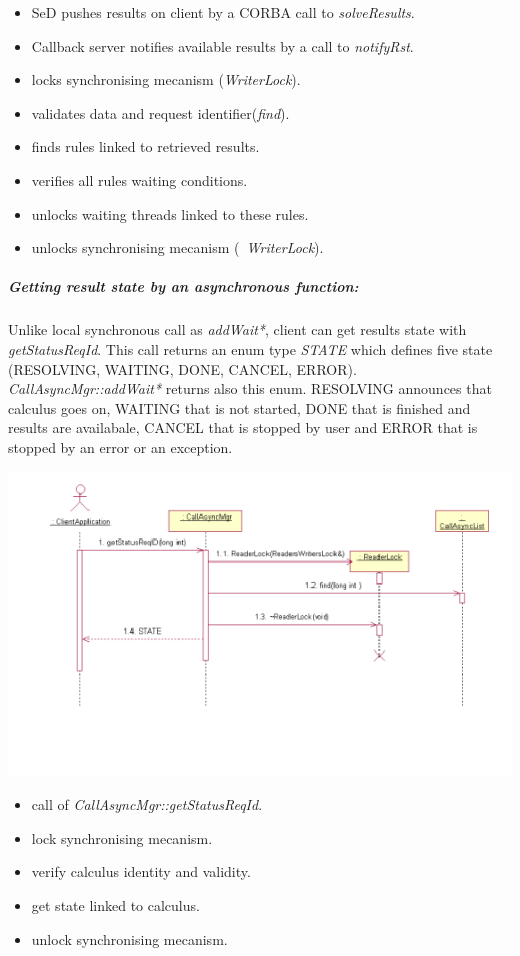   \begin{itemize}
  \item SeD pushes results on client by a CORBA call to \emph{solveResults}.
  \item Callback server notifies available results by a call to \emph{notifyRst}.
  \item locks synchronising mecanism (\emph{WriterLock}).
  \item validates data and request identifier(\emph{find}).
  \item finds rules linked to retrieved results.
  \item verifies all rules waiting conditions.
  \item unlocks waiting threads linked to these rules.
  \item unlocks synchronising mecanism (\emph{~WriterLock}).
  \end{itemize}

  \subparagraph{Getting result state by an asynchronous function:}
  Unlike local synchronous call as \emph{addWait*}, client can get results
  state with \emph{getStatusReqId}. This call returns an enum type \emph{STATE}
  which defines five state (RESOLVING, WAITING, DONE, CANCEL, ERROR).
  \emph{CallAsyncMgr::addWait*} returns also this enum.
  RESOLVING announces that calculus goes on, WAITING that is not started,
  DONE that is finished and results are availabale, CANCEL that is stopped
  by user and ERROR that is stopped by an error or an exception.

  \begin{center}
  \includegraphics{./fig/CallAsyncProbeSequenceDiagram1}
  \end{center}

  \begin{itemize}
  \item call of \emph{CallAsyncMgr::getStatusReqId}.
  \item lock synchronising mecanism.
  \item verify calculus identity and validity.
  \item get state linked to calculus.
  \item unlock synchronising mecanism.
  \end{itemize}

